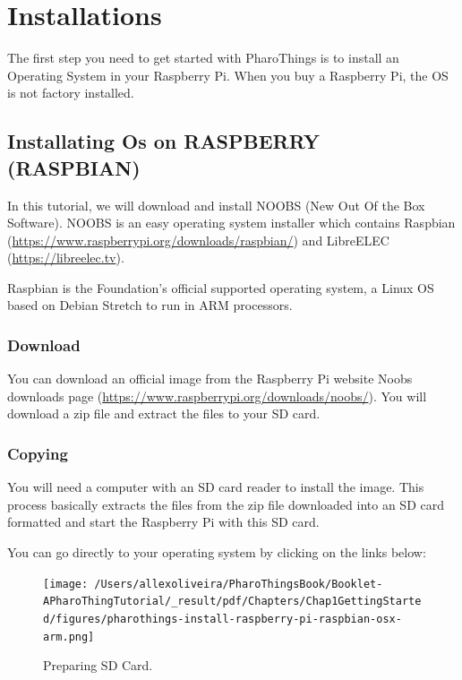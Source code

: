 \documentclass[10pt,twoside,english]{_support/latex/sbabook/sbabook}
\begin{document}
\frontmatter
\pagestyle{plain}

\tableofcontents*
\clearpage\listoffigures

\mainmatter

\chapter{Installations }
The first step you need to get started with PharoThings is to install an Operating System in your Raspberry Pi. When you buy a Raspberry Pi, the OS is not factory installed.
\section{Installating Os on RASPBERRY (RASPBIAN)}
In this tutorial, we will download and install NOOBS (New Out Of the Box Software). NOOBS is an easy operating system installer which contains Raspbian (\url{https://www.raspberrypi.org/downloads/raspbian/}) and LibreELEC (\url{https://libreelec.tv}).

Raspbian is the Foundation’s official supported operating system, a Linux OS based on Debian Stretch to run in ARM processors.
\subsection{Download}
You can download an official image from the Raspberry Pi website Noobs downloads page (\url{https://www.raspberrypi.org/downloads/noobs/}). You will download a zip file and extract the files to your SD card.
\subsection{Copying}
You will need a computer with an SD card reader to install the image.
This process basically extracts the files from the zip file downloaded into an SD card formatted and start the Raspberry Pi with this SD card.

You can go directly to your operating system by clicking on the links below:


\begin{figure}

\begin{center}
\texttt{[image: /Users/allexoliveira/PharoThingsBook/Booklet-APharoThingTutorial/\_result/pdf/Chapters/Chap1GettingStarted/figures/pharothings-install-raspberry-pi-raspbian-osx-arm.png]}\caption{Preparing SD Card.\label{macInstall}}\end{center}
\end{figure}
\end{document}
